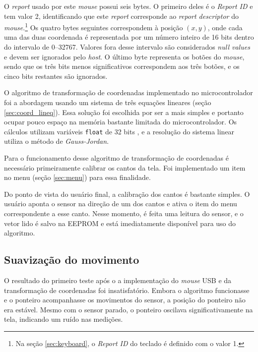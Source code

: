 \documentclass[brazil,pagestart=firstchapter]{abnt}
\begin{document}
O \textit{report} usado por este \textit{mouse} possui seis bytes. O
primeiro deles é o \textit{Report ID} e tem valor 2, identificando que este
\textit{report} corresponde ao \textit{report descriptor} do
\textit{mouse}.\footnote{
	Na seção \ref{sec:keyboard}, o \textit{Report ID} do teclado é definido
	com o valor 1.
} Os quatro bytes seguintes correspondem à posição $(x, y)$, onde cada uma
das duas coordenada é representada por um número inteiro de 16 bits dentro
do intervalo de \numrange{0}{32767}. Valores fora desse intervalo são
considerados \textit{null values} e devem ser ignorados pelo \textit{host}.
\cite[p.~20]{usbhid} O último byte representa os botões do \textit{mouse},
sendo que os três bits menos significativos correspondem aos três botões, e
os cinco bits restantes são ignorados.

O algoritmo de transformação de coordenadas implementado no microcontrolador
foi a abordagem usando um sistema de três equações lineares (seção
\ref{sec:coord_lineq}). Essa solução foi escolhida por ser a mais simples e
portanto ocupar pouco espaço na memória bastante limitada do
microcontrolador. Os cálculos utilizam variáveis \texttt{float} de 32 bits
\cite{avrlibcfaq}, e a resolução do sistema linear utiliza o método de
\textit{Gauss-Jordan}. \cite{GaussJordanInPython}

Para o funcionamento desse algoritmo de transformação de coordenadas é
necessário primeiramente calibrar os cantos da tela. Foi implementado um
item no menu (seção \ref{sec:menu}) para essa finalidade.

Do ponto de vista do usuário final, a calibração dos cantos é bastante
simples. O usuário aponta o sensor na direção de um dos cantos e ativa o
item do menu correspondente a esse canto. Nesse momento, é feita uma leitura
do sensor, e o vetor lido é salvo na \ac{EEPROM} e está imediatamente
disponível para uso do algoritmo.

\subsection{Suavização do movimento}
\label{sub:mouse_smoothing}

O resultado do primeiro teste após o a implementação do \textit{mouse}
\ac{USB} e da transformação de coordenadas foi insatisfatório. Embora o
algoritmo funcionasse e o ponteiro acompanhasse os movimentos do sensor, a
posição do ponteiro não era estável. Mesmo com o sensor parado, o ponteiro
oscilava significativamente na tela, indicando um ruído nas medições.
\end{document}
